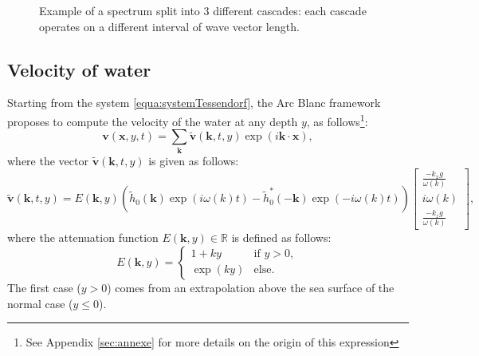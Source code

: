 \documentclass[final]{jcgt}
\def\framework{the Arc Blanc framework\xspace}
\begin{document}
\begin{figure}
	\centering
	
	\caption{Example of a spectrum split into $3$ different cascades: each cascade operates on a different interval of wave vector length.}
	\label{fig:cascades}
\end{figure}


\subsection{Velocity of water}
\label{subsec:velWater}
Starting from the system \ref{equa:systemTessendorf}, \framework proposes to compute the velocity of the water at any depth $y$, as follows\footnote{See Appendix   \ref{sec:annexe} for more details on the origin of this expression}:
\begin{equation}\label{equa:velocity}
	\mathbf v(\mathbf x,y,t)=
	\sum_{\mathbf{k}} \tilde{\mathbf{v}}(\mathbf{k},t,y)\exp\left(i\mathbf{k}\cdot\mathbf x\right),
\end{equation}
where the vector $\tilde{\mathbf{v}}(\mathbf{k},t, y)$ is given as follows:
\begin{equation}
	\tilde{\mathbf{v}}\left(\mathbf{k},t,y\right)=%
	E\left(\mathbf{k},y\right)\left(\tilde{h}_0\left(\mathbf{k}\right)\exp\left({i\omega(k)t}\right)-\tilde{h}_0^*\left(-\mathbf{k}\right)\exp\left({-i\omega(k)t}\right)\right)
	\left[
		\begin{array}{c}
			\displaystyle\frac{-k_xg}{\omega(k)} \\
			\displaystyle i\omega(k)             \\
			\displaystyle\frac{-k_zg}{\omega(k)}
		\end{array}
		\right],
\end{equation}
where the attenuation function $E(\mathbf{k},y)\in\mathbb R$ is defined as follows:
\begin{equation}
	\label{equa:attenuationDeep}
	E(\mathbf{k}, y)=
	\begin{cases}
		1+ky     & \text{if }y>0, \\
		\exp(ky) & \text{else}.
	\end{cases}
\end{equation}
The first case ($y>0$) comes from an extrapolation above the sea surface of the normal case ($y\leq0$).
\end{document}
